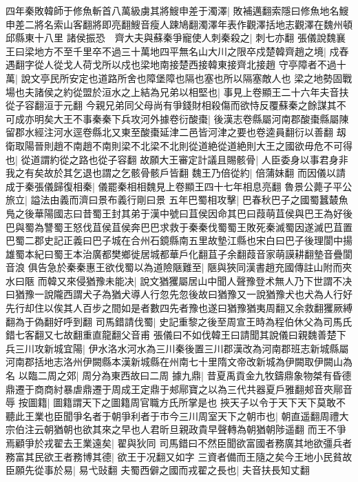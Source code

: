 四年秦敗韓師于修魚斬首八萬級虜其將䱸申差于濁澤|{
	敗補邁翻索隱曰修魚地名䱸申差二將名索山客翻將即亮翻䱸音瘦人踈鳩翻濁澤年表作觀澤括地志觀澤在魏州頓邱縣東十八里
	}
諸侯振恐　齊大夫與蘇秦爭寵使人刺秦殺之|{
	刺七亦翻
	}
張儀說魏襄王曰梁地方不至千里卒不過三十萬地四平無名山大川之限卒戍楚韓齊趙之境|{
	戍舂遇翻字從人從戈人荷戈所以戍也梁地南接楚西接韓東接齊北接趙
	}
守亭障者不過十萬|{
	說文亭民所安定也道路所舍也障堡障也隔也塞也所以隔塞敵人也
	}
梁之地勢固戰場也夫諸侯之約從盟於洹水之上結為兄弟以相堅也|{
	事見上卷顯王二十六年夫音扶從子容翻洹于元翻
	}
今親兄弟同父母尚有爭錢財相殺傷而欲恃反覆蘇秦之餘謀其不可成亦明矣大王不事秦秦下兵攻河外據卷衍酸棗|{
	後漢志卷縣屬河南郡酸棗縣屬陳留郡水經注河水逕卷縣北又東至酸棗延津二邑皆河津之要也卷逵員翻衍以善翻
	}
刼衛取陽晉則趙不南趙不南則梁不北梁不北則從道絶從道絶則大王之國欲毋危不可得也|{
	從道謂約從之路也從子容翻
	}
故願大王審定計議且賜骸骨|{
	人臣委身以事君身非我之有矣故於其乞退也謂之乞骸骨骸戶皆翻
	}
魏王乃倍從約|{
	倍蒲妹翻
	}
而因儀以請成于秦張儀歸復相秦|{
	儀罷秦相相魏見上卷顯王四十七年相息亮翻
	}
魯景公薨子平公旅立|{
	謚法由義而濟曰景布義行剛曰景
	}
五年巴蜀相攻擊|{
	巴春秋巴子之國蜀蠶樷魚鳬之後華陽國志曰昔蜀王封其弟于漢中號曰苴侯因命其巴曰葭萌苴侯與巴王為好後巴與蜀為讐蜀王怒伐苴侯苴侯奔巴巴求救于秦秦伐蜀蜀王敗死秦滅蜀因遂滅巴苴置巴蜀二郡史記正義曰巴子城在合州石鏡縣南五里故墊江縣也宋白曰巴子後理閬中揚雄蜀本紀曰蜀王本治廣都樊鄉徙居城都華戶化翻苴子余翻葭音家萌謨耕翻墊音疊閬音浪
	}
俱告急於秦秦惠王欲伐蜀以為道險陿難至|{
	陿與狹同漢書趙充國傳註山附而夾水曰陿
	}
而韓又來侵猶豫未能决|{
	說文猶玃屬居山中聞人聲豫登术無人乃下世謂不决曰猶豫一說隴西謂犬子為猶犬導人行忽先忽後故曰猶豫又一說猶豫犬也犬為人行好先行却住以俟其人百步之間如是者數四先者豫也遂曰猶豫猶夷周翻又余救翻玃厥縛翻為于偽翻好呼到翻
	}
司馬錯請伐蜀|{
	史記重黎之後至周宣王時為程伯休父為司馬氏錯七客翻又七故翻重直龍翻父音甫
	}
張儀曰不如伐韓王曰請聞其說儀曰親魏善楚下兵三川攻新城宜陽|{
	伊水洛水河水為三川秦後置三川郡漢改為河南郡班志新城縣屬河南郡括地志洛州伊闕縣本漢新城縣在州南七十里隋文帝改新城為伊闕取伊闕山為名
	}
以臨二周之郊|{
	周分為東西故曰二周
	}
據九鼎|{
	昔夏禹貢金九牧鑄鼎象物桀有昏德鼎遷于商商紂暴虐鼎遷于周成王定鼎于郟鄏寶之以為三代共器夏戶雅翻郟音夾鄏音辱
	}
按圖籍|{
	圖籍謂天下之圖籍周官職方氏所掌是也
	}
挾天子以令于天下天下莫敢不聽此王業也臣聞爭名者于朝爭利者于市今三川周室天下之朝市也|{
	朝直遥翻周禮大宗伯注云朝猶朝也欲其來之早也人君昕旦親政貴早聲轉為朝猶朝陟遥翻
	}
而王不爭焉顧爭於戎翟去王業遠矣|{
	翟與狄同
	}
司馬錯曰不然臣聞欲富國者務廣其地欲彊兵者務富其民欲王者務博其德|{
	欲王于况翻又如字
	}
三資者備而王隨之矣今王地小民貧故臣願先從事於易|{
	易弋䜴翻
	}
夫蜀西僻之國而戎翟之長也|{
	夫音扶長知丈翻
	}

